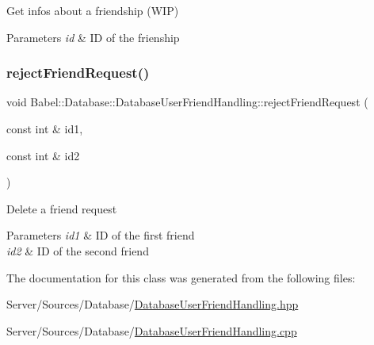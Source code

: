 Get infos about a friendship (W\+IP) 
\begin{DoxyParams}{Parameters}
{\em id} & ID of the frienship \\
\hline
\end{DoxyParams}
\mbox{\label{classBabel_1_1Database_1_1DatabaseUserFriendHandling_a8ea2097e590e629a0a1aea31c1260600}} 
\subsubsection{\texorpdfstring{reject\+Friend\+Request()}{rejectFriendRequest()}}
{\footnotesize\ttfamily void Babel\+::\+Database\+::\+Database\+User\+Friend\+Handling\+::reject\+Friend\+Request (\begin{DoxyParamCaption}\item[{const int \&}]{id1,  }\item[{const int \&}]{id2 }\end{DoxyParamCaption})}

Delete a friend request 
\begin{DoxyParams}{Parameters}
{\em id1} & ID of the first friend \\
\hline
{\em id2} & ID of the second friend \\
\hline
\end{DoxyParams}


The documentation for this class was generated from the following files\+:\begin{DoxyCompactItemize}
\item 
Server/\+Sources/\+Database/\hyperlink{DatabaseUserFriendHandling_8hpp}{Database\+User\+Friend\+Handling.\+hpp}\item 
Server/\+Sources/\+Database/\hyperlink{DatabaseUserFriendHandling_8cpp}{Database\+User\+Friend\+Handling.\+cpp}\end{DoxyCompactItemize}
